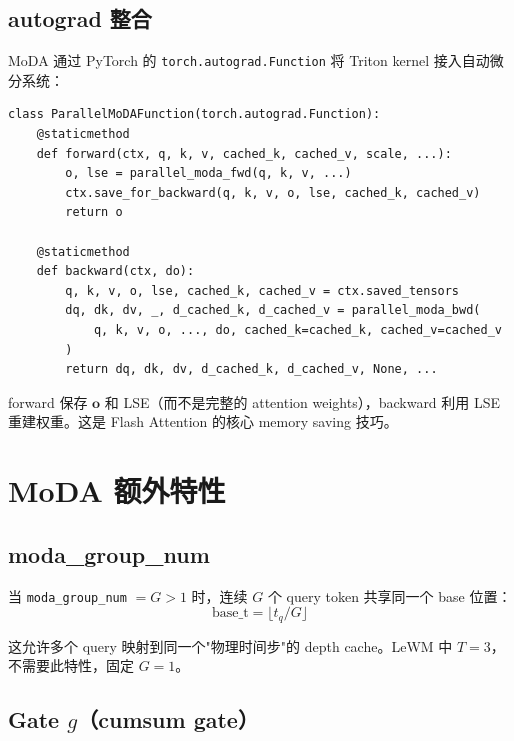 \documentclass[11pt,a4paper]{article}
\begin{document}
\subsection{autograd 整合}

MoDA 通过 PyTorch 的 \texttt{torch.autograd.Function} 将 Triton kernel 接入自动微分系统：

\begin{lstlisting}[title=autograd 接口（简化）]
class ParallelMoDAFunction(torch.autograd.Function):
    @staticmethod
    def forward(ctx, q, k, v, cached_k, cached_v, scale, ...):
        o, lse = parallel_moda_fwd(q, k, v, ...)
        ctx.save_for_backward(q, k, v, o, lse, cached_k, cached_v)
        return o

    @staticmethod
    def backward(ctx, do):
        q, k, v, o, lse, cached_k, cached_v = ctx.saved_tensors
        dq, dk, dv, _, d_cached_k, d_cached_v = parallel_moda_bwd(
            q, k, v, o, ..., do, cached_k=cached_k, cached_v=cached_v
        )
        return dq, dk, dv, d_cached_k, d_cached_v, None, ...
\end{lstlisting}

forward 保存 $\mathbf{o}$ 和 LSE（而不是完整的 attention weights），backward 利用 LSE 重建权重。这是 Flash Attention 的核心 memory saving 技巧。

\section{MoDA 额外特性}

\subsection{moda\_group\_num}

当 \texttt{moda\_group\_num} $= G > 1$ 时，连续 $G$ 个 query token 共享同一个 base 位置：
\begin{equation}
  \text{base\_t} = \lfloor t_q / G \rfloor
\end{equation}

这允许多个 query 映射到同一个"物理时间步"的 depth cache。LeWM 中 $T=3$，不需要此特性，固定 $G=1$。

\subsection{Gate $g$（cumsum gate）}
\end{document}
